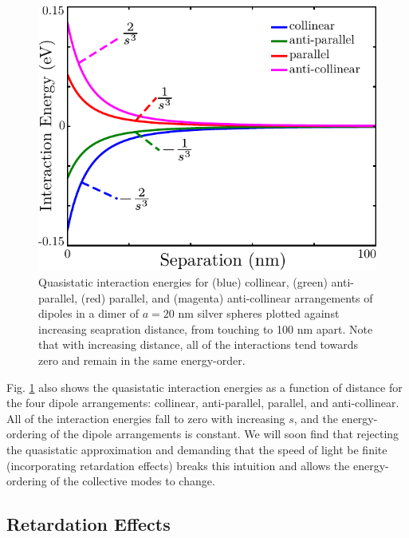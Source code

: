 \documentclass [11pt, proquest] {uwthesis}[2016/11/22]
\begin{document}
\begin{figure}
\begin{centering}
\includegraphics{dimer_stat.pdf}
\caption{Quasistatic interaction energies for (blue) collinear, (green) anti-parallel, (red) parallel, and (magenta) anti-collinear arrangements of dipoles in a dimer of $a=20$ nm silver spheres plotted against increasing seapration distance, from touching to 100 nm apart. Note that with increasing distance, all of the interactions tend towards zero and remain in the same energy-order.}
\label{dimer_stat}
\end{centering}
\end{figure}

Fig. \ref{dimer_stat} also shows the quasistatic interaction energies as a function of distance for the four dipole arrangements: collinear, anti-parallel, parallel, and anti-collinear. All of the interaction energies fall to zero with increasing $s$, and the energy-ordering of the dipole arrangements is constant. We will soon find that rejecting the quasistatic approximation and demanding that the speed of light be finite (incorporating retardation effects) breaks this intuition and allows the energy-ordering of the collective modes to change.

\subsection{Retardation Effects}
\end{document}
